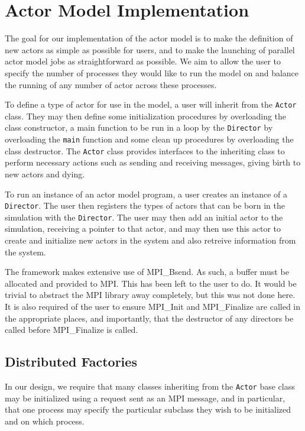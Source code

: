 \documentclass[12pt,a4paper]{article}
\newcommand{\term}[1]{\texttt{#1}}
\begin{document}
\newpage
\section{Actor Model Implementation}
The goal for our implementation of the actor model is to make the
definition of new actors as simple as possible for users,
and to make the launching of parallel actor model jobs as
straightforward as possible.
We aim to allow the user to specify the number of processes
they would like to run the model on and balance the running
of any number of actor across these processes.

To define a type of actor for use in the model, a user
will inherit from the \term{Actor} class.
They may then define some initialization procedures by
overloading the class constructor,
a main function to be run in a loop by the \term{Director} by
overloading the \term{main} function
and some clean up procedures by
overloading the class destructor.
The \term{Actor} class provides interfaces to the inheriting class
to perform necessary actions such as sending and receiving messages,
giving birth to new actors
and dying.

To run an instance of an actor model program,
a user creates an instance of a \term{Director}.
The user then registers the types of actors that can be born in
the simulation with the \term{Director}.
The user may then add an initial actor to the simulation,
receiving a pointer to that actor,
and may then use this actor to create and initialize
new actors in the system
and also retreive information from the system.

The framework makes extensive use of MPI\_Bsend.
As such, a buffer must be allocated and provided to MPI.
This has been left to the user to do.
It would be trivial to abstract the MPI library away completely,
but this was not done here.
It is also required of the user to ensure MPI\_Init and MPI\_Finalize
are called in the appropriate places, and importantly, that the
destructor of any directors be called before MPI\_Finalize is
called.


\subsection{Distributed Factories}
In our design, we require that many classes inheriting from the
\term{Actor} base class may be initialized using a request sent as an MPI
message,
and in particular, that one process may specify the particular
subclass they wish to be initialized and on which process.
\end{document}

